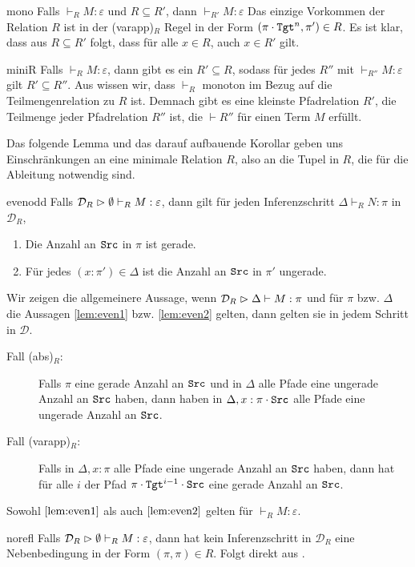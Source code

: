 \begin{lemma}{}{mono}
    Falls $\vdash_R M:\varepsilon$ und $R\subseteq R'$, dann $\vdash_{R'} M : \varepsilon$
    \Proof
    Das einzige Vorkommen der Relation $R$ ist in der (varapp)$_R$ Regel in der Form $(\pi\cdot\texttt{Tgt}^n,\pi')\in R$. Es ist klar, dass aus $R\subseteq R'$ folgt, dass für alle $x\in R$, auch  $x\in R'$ gilt.
\end{lemma}
\begin{corollary}{}{miniR}
    Falls $\vdash_R M:\varepsilon$, dann gibt es ein $R'\subseteq R$, sodass für jedes $R''$ mit $\vdash_{R''} M : \varepsilon$ gilt $R'\subseteq R''$.
    \Proof
    Aus  wissen wir, dass $\vdash_R$ monoton im Bezug auf die Teilmengenrelation zu $R$ ist. Demnach gibt es eine kleinste Pfadrelation $R'$, die Teilmenge jeder Pfadrelation $R''$ ist, die $\vdash R''$ für einen Term $M$ erfüllt.
\end{corollary}

Das folgende Lemma und das darauf aufbauende Korollar geben uns Einschränkungen an eine minimale Relation $R$, also an die Tupel in $R$, die für die Ableitung notwendig sind.

\begin{lemma}{}{evenodd}
    Falls $\mathcal{D}_R\vartriangleright\emptyset\vdash_R M : \varepsilon$, dann gilt für jeden Inferenzschritt $\Delta \vdash_R N:\pi$ in $\mathcal{D}_R$,
    \begin{enumerate}[label=(\roman*)]
        \item Die Anzahl an $\texttt{Src}$ in $\pi$ ist gerade.\label{lem:even1}
        \item Für jedes $(x:\pi')\in\Delta$ ist die Anzahl an $\texttt{Src}$ in $\pi'$ ungerade.\label{lem:even2}
    \end{enumerate}
\Proofidea
Wir zeigen die allgemeinere Aussage, wenn $\mathcal{D}_R\vartriangleright\Delta\vdash M : \pi$ und für $\pi$ bzw. $\Delta$ die Aussagen \ref{lem:even1} bzw. \ref{lem:even2} gelten, dann gelten sie in jedem Schritt in $\mathcal{D}$.

\begin{description}
    \item[Fall (abs)$_R$:] Falls $\pi$ eine gerade Anzahl an $\texttt{Src}$ und in $\Delta$ alle Pfade eine ungerade Anzahl an $\texttt{Src}$ haben, dann haben in $\Delta, x:\pi\cdot\texttt{Src}$ alle Pfade eine ungerade Anzahl an $\texttt{Src}$.
    \item[Fall (varapp)$_R$:] Falls in $\Delta, x:\pi$ alle Pfade eine ungerade Anzahl an $\texttt{Src}$ haben, dann hat für alle $i$ der Pfad $\pi\cdot\texttt{Tgt}^{i-1}\cdot\texttt{Src}$ eine gerade Anzahl  an $\texttt{Src}$.
\end{description}

Sowohl $\ref{lem:even1}$ als auch $\ref{lem:even2}$ gelten für $\vdash_R M : \varepsilon$.
\end{lemma}
\begin{corollary}{}{norefl}
    Falls $\mathcal{D}_R\vartriangleright\emptyset\vdash_R M :\varepsilon$, dann hat kein Inferenzschritt in $\mathcal{D}_R$ eine Nebenbedingung in der Form $(\pi, \pi)\in R$.    
    \Proofidea
    Folgt direkt aus .
\end{corollary}

